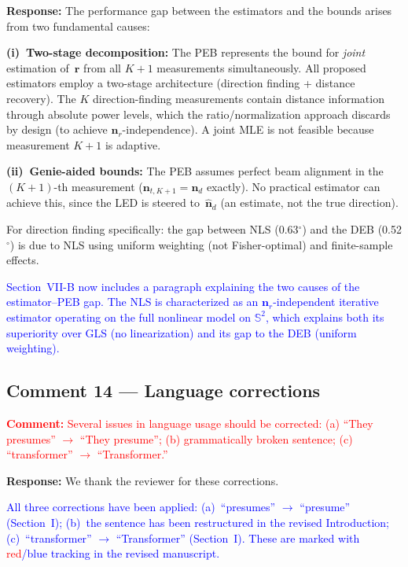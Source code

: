 \documentclass[11pt]{article}
\newcommand{\reviewercomment}[1]{\noindent\textcolor{red}{\textbf{Comment:} #1}\par\vspace{6pt}}
\newcommand{\response}{\noindent\textbf{Response:} }
\newcommand{\change}[1]{\textcolor{blue}{#1}}
\begin{document}
\response The performance gap between the estimators and the bounds arises from two fundamental causes:

\textbf{(i)~Two-stage decomposition:} The PEB represents the bound for \emph{joint} estimation of~$\mathbf{r}$ from all $K+1$ measurements simultaneously. All proposed estimators employ a two-stage architecture (direction finding + distance recovery). The $K$ direction-finding measurements contain distance information through absolute power levels, which the ratio/normalization approach discards by design (to achieve $\mathbf{n}_r$-independence). A joint MLE is not feasible because measurement $K+1$ is adaptive.

\textbf{(ii)~Genie-aided bounds:} The PEB assumes perfect beam alignment in the $(K+1)$-th measurement ($\mathbf{n}_{t,K+1} = \mathbf{n}_d$ exactly). No practical estimator can achieve this, since the LED is steered to~$\hat{\mathbf{n}}_d$ (an estimate, not the true direction).

For direction finding specifically: the gap between NLS (0.63$^\circ$) and the DEB (0.52$^\circ$) is due to NLS using uniform weighting (not Fisher-optimal) and finite-sample effects.

\change{Section~VII-B now includes a paragraph explaining the two causes of the estimator--PEB gap. The NLS is characterized as an $\mathbf{n}_r$-independent iterative estimator operating on the full nonlinear model on $\mathbb{S}^2$, which explains both its superiority over GLS (no linearization) and its gap to the DEB (uniform weighting).}

\subsection{Comment 14 --- Language corrections}

\reviewercomment{Several issues in language usage should be corrected: (a) ``They presumes'' $\to$ ``They presume''; (b) grammatically broken sentence; (c) ``transformer'' $\to$ ``Transformer.''}

\response We thank the reviewer for these corrections.

\change{All three corrections have been applied: (a)~``presumes'' $\to$ ``presume'' (Section~I); (b)~the sentence has been restructured in the revised Introduction; (c)~``transformer'' $\to$ ``Transformer'' (Section~I). These are marked with \textcolor{red}{red}/\textcolor{blue}{blue} tracking in the revised manuscript.}
\end{document}
